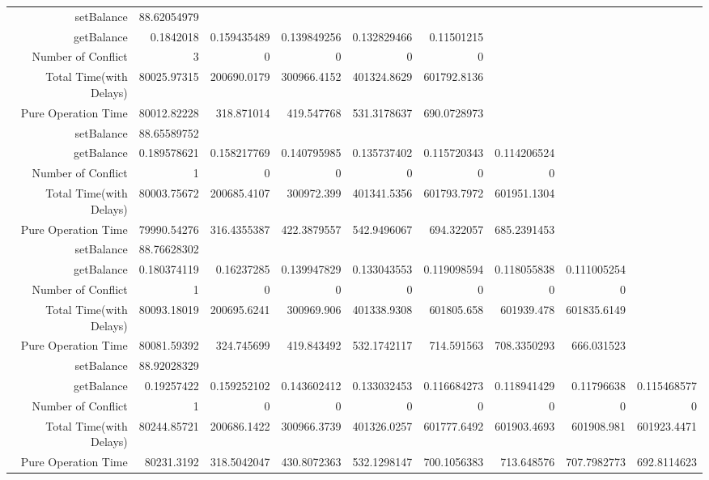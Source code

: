 \begin{landscape}
\begin{table}[htbp]
\begin{tabular}{rrrrrrrrr}
    \cline{1-9}
    setBalance & 88.62054979 &       &       &       &       &       &       &  \\
    getBalance & 0.1842018 & 0.159435489 & 0.139849256 & 0.132829466 & 0.11501215 &       &       &  \\
    Number of Conflict & 3     & 0     & 0     & 0     & 0     &       &       &  \\
    Total Time(with Delays) & 80025.97315 & 200690.0179 & 300966.4152 & 401324.8629 & 601792.8136 &       &       &  \\
    Pure Operation Time & 80012.82228 & 318.871014 & 419.547768 & 531.3178637 & 690.0728973 &       &       &  \\
\cline{1-9}    
    setBalance & 88.65589752 &       &       &       &       &       &       &  \\
    getBalance & 0.189578621 & 0.158217769 & 0.140795985 & 0.135737402 & 0.115720343 & 0.114206524 &       &  \\
    Number of Conflict & 1     & 0     & 0     & 0     & 0     & 0     &       &  \\
    Total Time(with Delays) & 80003.75672 & 200685.4107 & 300972.399 & 401341.5356 & 601793.7972 & 601951.1304 &       &  \\
    Pure Operation Time & 79990.54276 & 316.4355387 & 422.3879557 & 542.9496067 & 694.322057 & 685.2391453 &       &  \\
\cline{1-9}    
    setBalance & 88.76628302 &       &       &       &       &       &       &  \\
    getBalance & 0.180374119 & 0.16237285 & 0.139947829 & 0.133043553 & 0.119098594 & 0.118055838 & 0.111005254 &  \\
    Number of Conflict & 1     & 0     & 0     & 0     & 0     & 0     & 0     &  \\
    Total Time(with Delays) & 80093.18019 & 200695.6241 & 300969.906 & 401338.9308 & 601805.658 & 601939.478 & 601835.6149 &  \\
    Pure Operation Time & 80081.59392 & 324.745699 & 419.843492 & 532.1742117 & 714.591563 & 708.3350293 & 666.031523 &  \\
\cline{1-9}    
    setBalance & 88.92028329 &       &       &       &       &       &       &  \\
    getBalance & 0.19257422 & 0.159252102 & 0.143602412 & 0.133032453 & 0.116684273 & 0.118941429 & 0.11796638 & 0.115468577 \\
    Number of Conflict & 1     & 0     & 0     & 0     & 0     & 0     & 0     & 0 \\
    Total Time(with Delays) & 80244.85721 & 200686.1422 & 300966.3739 & 401326.0257 & 601777.6492 & 601903.4693 & 601908.981 & 601923.4471 \\
    Pure Operation Time & 80231.3192 & 318.5042047 & 430.8072363 & 532.1298147 & 700.1056383 & 713.648576 & 707.7982773 & 692.8114623 \\
    \bottomrule
    \end{tabular}%
  \label{tab:increments & reads RMIOnly}%
\end{table}%
\end{landscape}


